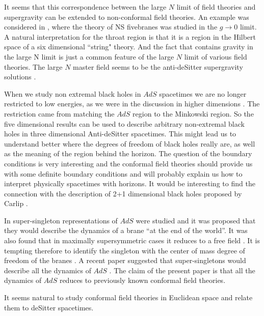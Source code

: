It seems that this  correspondence between the large 
$N$ limit of field theories and supergravity can be extended to 
non-conformal field theories. 
An example was considered in \msfive , where the theory of NS fivebranes
was studied in the $g \to 0$ limit. 
A  natural interpretation for the throat region is that it is a region
in the Hilbert space of a six dimensional ``string" theory.  
And the fact 
that contains gravity in the large N limit is just a common  feature
of the large $N$ limit of various field theories. 
The large $N$ master field seems to be the anti-deSitter supergravity 
solutions \dps . 


When we study non extremal 
black holes in $AdS$ spacetimes we are no longer
restricted to low energies, as we were in the discussion in higher
dimensions . 
The restriction came from matching the $AdS$ region to the 
Minkowski region.  So the five dimensional results  
 can be used to 
describe arbitrary non-extremal black holes in three dimensional 
Anti-deSitter spacetimes. This might lead us to understand better where
the degrees of freedom of black holes really are, as well as the 
meaning of the region behind the horizon.
The question of the boundary conditions is very interesting and
the conformal field theories should provide us with some
definite boundary conditions and will probably explain us how
to interpret physically  spacetimes with horizons. 
It would be interesting to find the connection
with the description of 2+1 dimensional black holes 
proposed by Carlip \carlip . 

In 
super-singleton representations of $AdS$ were studied
and it was proposed that they would describe the dynamics of a brane
``at the end of the world''. It was also found that in maximally
supersymmetric
cases it reduces to a free field \singleton .
It is tempting therefore to identify
the singleton  with the center of mass degree of freedom of the branes
. A recent paper suggested that super-singletons
would describe all the dynamics of $AdS$ \sfkostas . The claim
of the present paper is that all the dynamics of $AdS$ reduces to 
previously known
conformal field theories.

   

It seems natural  to study conformal field theories in Euclidean space  
and relate them to deSitter spacetimes.
 
